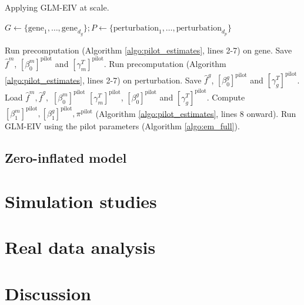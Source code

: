 \documentclass[12pt]{article}
\begin{document}
\begin{algorithm}
	\caption{Applying GLM-EIV at scale.}\label{algo:at_scale}
	\begin{algorithmic}
		\State $G \gets \{\textrm{gene}_1, \dots, \textrm{gene}_{d_g}\}; P \gets \{\textrm{perturbation}_1, \dots, \textrm{perturbation}_{d_p}\}$
		
			\State Run precomputation (Algorithm \ref{algo:pilot_estimates}, lines 2-7) on gene. \State Save $\hat{f}^m$, $[\beta^m_0]^\textrm{pilot}$ and $[\gamma^T_m]^\textrm{pilot}$.
		\EndFor
		\State Run precomputation  (Algorithm \ref{algo:pilot_estimates}, lines 2-7) on perturbation.
		\State Save $\hat{f}^g$, $[\beta^g_0]^\textrm{pilot}$ and $[\gamma^T_g]^\textrm{pilot}$.
		\EndFor
		\State Load $\hat{f}^m, \hat{f}^g,$ $[\beta^m_0]^\textrm{pilot}$ $[\gamma^T_m]^\textrm{pilot}$, $[\beta^g_0]^\textrm{pilot}$ and $[\gamma^T_g]^\textrm{pilot}$.
		\State Compute $[\beta^m_1]^\textrm{pilot}, [\beta^g_1]^\textrm{pilot}, \pi^\textrm{pilot}$ (Algorithm \ref{algo:pilot_estimates}, lines 8 onward).
		\State Run GLM-EIV using the pilot parameters (Algorithm \ref{algo:em_full}).
		\EndFor
	\end{algorithmic}
\end{algorithm}

\subsection{Zero-inflated model}

\section{Simulation studies}

\section{Real data analysis}

\section{Discussion}
\end{document}
